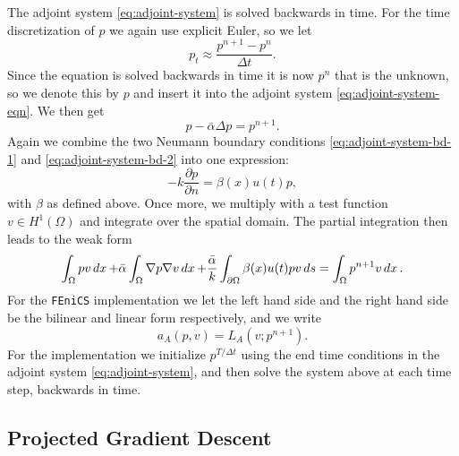 The adjoint system \eqref{eq:adjoint-system} is solved backwards in time. For the time discretization of $p$ we again use explicit Euler, so we let 
\begin{equation*}
 p_t \approx \frac{p^{n+1} - p^n}{\Delta t}.
\end{equation*}
Since the equation is solved backwards in time it is now $p^n$ that is the unknown, so we denote this by $p$ and insert it into the adjoint system \eqref{eq:adjoint-system-eqn}. We then get
\begin{equation*}
    p - \bar{\alpha}\Delta p =  p^{n+1}.
\end{equation*}
Again we combine the two Neumann boundary conditions \eqref{eq:adjoint-system-bd-1} and \eqref{eq:adjoint-system-bd-2} into one expression:
\begin{equation*}
    -k\frac{\partial p}{\partial n} = \beta(x)u(t)p,
\end{equation*}
with $\beta$ as defined above. Once more, we multiply with a test function $v\in H^1(\Omega)$ and integrate over the spatial domain. The partial integration then leads to the weak form
\begin{equation*}
    \int_\Omega pv\mathop{dx} + \bar{\alpha} \int_\Omega \nabla p \nabla v \mathop{dx} + \frac{\bar{\alpha}}{k}\int_{\partial\Omega} \beta(x)u(t)pv \mathop{ds}  = \int_\Omega p^{n+1}v\mathop{dx}.
\end{equation*}
For the \verb|FEniCS| implementation we let the left hand side and the right hand side be the bilinear and linear form respectively, and we write
\begin{equation*}
    a_A(p, v) = L_A(v; p^{n+1}).
\end{equation*}
For the implementation we initialize $p^{T/\Delta t}$ using the end time conditions in the adjoint system \eqref{eq:adjoint-system}, and then solve the system above at each time step, backwards in time.


\subsection{Projected Gradient Descent}


